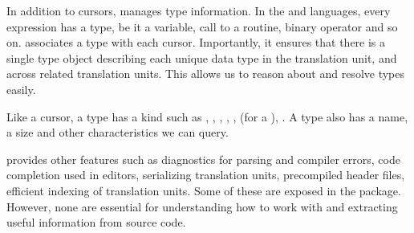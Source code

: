 In addition to cursors, \libclang{} manages type information.  In the
\C{} and \Cpp{} languages, every expression has a type, be it a
variable, call to a routine, binary operator and so on.  \libclang{}
associates a type with each cursor.  Importantly, it ensures that
there is a single type object describing each unique data type in the
translation unit, and across related translation units.  This allows
us to reason about and resolve types easily.

Like a cursor, a type has a kind such as ,
, ,
, ,
 (for a ),
.  A type also has a name, a size and other
characteristics we can query.


\libclang{} provides other features such as diagnostics for parsing
and compiler errors, code completion used in editors, serializing
translation units, precompiled header files, efficient indexing of
translation units.  Some of these are exposed in the 
package. However, none are essential for understanding how to work
with \libclang{} and extracting useful information from source code.

